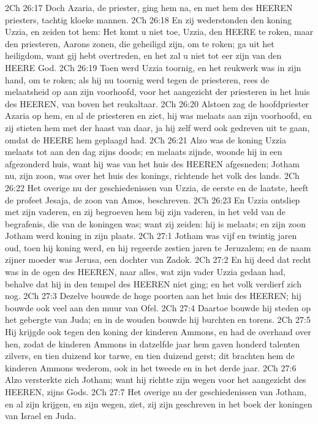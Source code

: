 2Ch 26:17  Doch Azaria, de priester, ging hem na, en met hem des HEEREN priesters, tachtig kloeke mannen.
2Ch 26:18  En zij wederstonden den koning Uzzia, en zeiden tot hem: Het komt u niet toe, Uzzia, den HEERE te roken, maar den priesteren, Aarons zonen, die geheiligd zijn, om te roken; ga uit het heiligdom, want gij hebt overtreden, en het zal u niet tot eer zijn van den HEERE God.
2Ch 26:19  Toen werd Uzzia toornig, en het reukwerk was in zijn hand, om te roken; als hij nu toornig werd tegen de priesteren, rees de melaatsheid op aan zijn voorhoofd, voor het aangezicht der priesteren in het huis des HEEREN, van boven het reukaltaar.
2Ch 26:20  Alstoen zag de hoofdpriester Azaria op hem, en al de priesteren en ziet, hij was melaats aan zijn voorhoofd, en zij stieten hem met der haast van daar, ja hij zelf werd ook gedreven uit te gaan, omdat de HEERE hem geplaagd had.
2Ch 26:21  Alzo was de koning Uzzia melaats tot aan den dag zijns doods; en melaats zijnde, woonde hij in een afgezonderd huis, want hij was van het huis des HEEREN afgesneden; Jotham nu, zijn zoon, was over het huis des konings, richtende het volk des lands.
2Ch 26:22  Het overige nu der geschiedenissen van Uzzia, de eerste en de laatste, heeft de profeet Jesaja, de zoon van Amos, beschreven.
2Ch 26:23  En Uzzia ontsliep met zijn vaderen, en zij begroeven hem bij zijn vaderen, in het veld van de begrafenis, die van de koningen was; want zij zeiden: hij is melaats; en zijn zoon Jotham werd koning in zijn plaats.
2Ch 27:1  Jotham was vijf en twintig jaren oud, toen hij koning werd, en hij regeerde zestien jaren te Jeruzalem; en de naam zijner moeder was Jerusa, een dochter van Zadok.
2Ch 27:2  En hij deed dat recht was in de ogen des HEEREN, naar alles, wat zijn vader Uzzia gedaan had, behalve dat hij in den tempel des HEEREN niet ging; en het volk verdierf zich nog.
2Ch 27:3  Dezelve bouwde de hoge poorten aan het huis des HEEREN; hij bouwde ook veel aan den muur van Ofel.
2Ch 27:4  Daartoe bouwde hij steden op het gebergte van Juda; en in de wouden bouwde hij burchten en torens.
2Ch 27:5  Hij krijgde ook tegen den koning der kinderen Ammons, en had de overhand over hen, zodat de kinderen Ammons in datzelfde jaar hem gaven honderd talenten zilvers, en tien duizend kor tarwe, en tien duizend gerst; dit brachten hem de kinderen Ammons wederom, ook in het tweede en in het derde jaar.
2Ch 27:6  Alzo versterkte zich Jotham; want hij richtte zijn wegen voor het aangezicht des HEEREN, zijns Gods.
2Ch 27:7  Het overige nu der geschiedenissen van Jotham, en al zijn krijgen, en zijn wegen, ziet, zij zijn geschreven in het boek der koningen van Israel en Juda.
